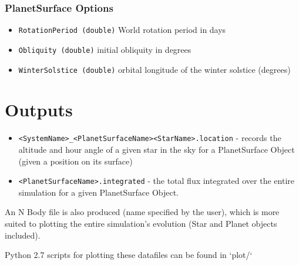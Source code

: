 \documentclass[usenatbib,11pt]{article}
\begin{document}
\subsubsection{PlanetSurface Options}

\begin{itemize}
\item{\texttt{RotationPeriod (double)}} World rotation period in days
\item{\texttt{Obliquity (double)}} initial obliquity in degrees
\item{\texttt{WinterSolstice (double)}} orbital longitude of the winter solstice (degrees)
\end{itemize}

\section{Outputs}


\begin{itemize}
\item{\texttt{<SystemName>_<PlanetSurfaceName><StarName>.location}} - records the altitude and hour angle of a given star in the sky for a PlanetSurface Object (given a position on its surface) 
\item{\texttt{<PlanetSurfaceName>.integrated}} - the total flux integrated over the entire simulation for a given PlanetSurface Object.
\end{itemize}


An N Body file is also produced (name specified by the user), which is more suited to plotting the entire simulation's evolution (Star and Planet objects included).

Python 2.7 scripts for plotting these datafiles can be found in `plot/`
\end{document}
